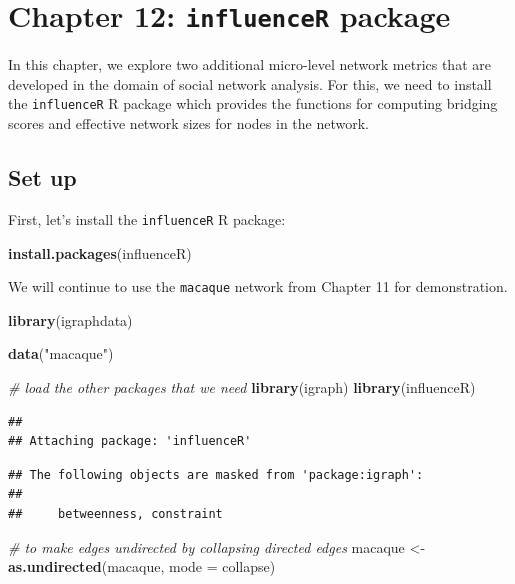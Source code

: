 \documentclass[
]{book}
\newenvironment{Shaded}{\begin{snugshade}}{\end{snugshade}}
\newcommand{\AttributeTok}[1]{\textcolor[rgb]{0.13,0.29,0.53}{#1}}
\newcommand{\CommentTok}[1]{\textcolor[rgb]{0.56,0.35,0.01}{\textit{#1}}}
\newcommand{\FunctionTok}[1]{\textcolor[rgb]{0.13,0.29,0.53}{\textbf{#1}}}
\newcommand{\NormalTok}[1]{#1}
\newcommand{\OtherTok}[1]{\textcolor[rgb]{0.56,0.35,0.01}{#1}}
\newcommand{\StringTok}[1]{\textcolor[rgb]{0.31,0.60,0.02}{#1}}
\begin{document}
\chapter{\texorpdfstring{Chapter 12: \texttt{influenceR} package}{Chapter 12: influenceR package}}\label{ch12}

In this chapter, we explore two additional micro-level network metrics that are developed in the domain of social network analysis. For this, we need to install the \texttt{influenceR} R package which provides the functions for computing bridging scores and effective network sizes for nodes in the network.

\section{Set up}\label{set-up-2}

First, let's install the \texttt{influenceR} R package:

\begin{Shaded}
\begin{Highlighting}[]
\FunctionTok{install.packages}\NormalTok{(}\StringTok{\textquotesingle{}influenceR\textquotesingle{}}\NormalTok{)}
\end{Highlighting}
\end{Shaded}

We will continue to use the \texttt{macaque} network from Chapter 11 for demonstration.

\begin{Shaded}
\begin{Highlighting}[]
\FunctionTok{library}\NormalTok{(igraphdata)}

\FunctionTok{data}\NormalTok{(}\StringTok{"macaque"}\NormalTok{)}

\CommentTok{\# load the other packages that we need }
\FunctionTok{library}\NormalTok{(igraph)}
\FunctionTok{library}\NormalTok{(influenceR)}
\end{Highlighting}
\end{Shaded}

\begin{verbatim}
## 
## Attaching package: 'influenceR'
\end{verbatim}

\begin{verbatim}
## The following objects are masked from 'package:igraph':
## 
##     betweenness, constraint
\end{verbatim}

\begin{Shaded}
\begin{Highlighting}[]
\CommentTok{\# to make edges undirected by collapsing directed edges }
\NormalTok{macaque }\OtherTok{\textless{}{-}} \FunctionTok{as.undirected}\NormalTok{(macaque, }\AttributeTok{mode =} \StringTok{\textquotesingle{}collapse\textquotesingle{}}\NormalTok{)}
\end{Highlighting}
\end{Shaded}
\end{document}
